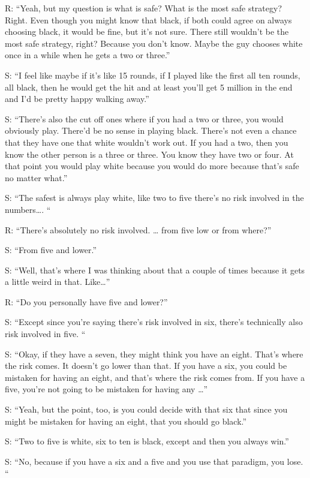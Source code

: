 \documentclass[a4paper,superscriptaddress,nofootinbib]{revtex4}
\begin{document}
R: “Yeah, but my question is what is safe? What is the most safe strategy? Right. Even though you might know that black, if both could agree on always choosing black, it would be fine, but it's not sure. There still wouldn't be the most safe strategy, right? Because you don't know. Maybe the guy chooses white once in a while when he gets a two or three.”

S: “I feel like maybe if it's like 15 rounds, if I played like the first all ten rounds, all black, then he would get the hit and at least you'll get 5 million in the end and I'd be pretty happy walking away.”

S: “There's also the cut off ones where if you had a two or three, you would obviously play.  There'd be no sense in playing black. There's not even a chance that they have one that white wouldn't work out. If you had a two, then you know the other person is a three or three. You know they have two or four. At that point you would play white because you would do more because that's safe no matter what.”

S: “The safest is always play white, like two to five there's no risk involved in the numbers…. “ %

R: “There's absolutely no risk involved. … from five low or from where?”

S: “From five and lower.”

S: “Well, that's where I was thinking about that a couple of times because it gets a little weird in that. Like…”

R: “Do you personally have five and lower?”

S: “Except since you're saying there's risk involved in six, there's technically also risk involved in five. “

S: “Okay, if they have a seven, they might think you have an eight. That's where the risk comes. It doesn't go lower than that. If you have a six, you could be mistaken for having an eight, and that's where the risk comes from. If you have a five, you're not going to be mistaken for having any …”

S: “Yeah, but the point, too, is you could decide with that six that since you might be mistaken for having an eight, that you should go black.”

S: “Two to five is white, six to ten is black, except and then you always win.”

S: “No, because if you have a six and a five and you use that paradigm, you lose. “
\end{document}
